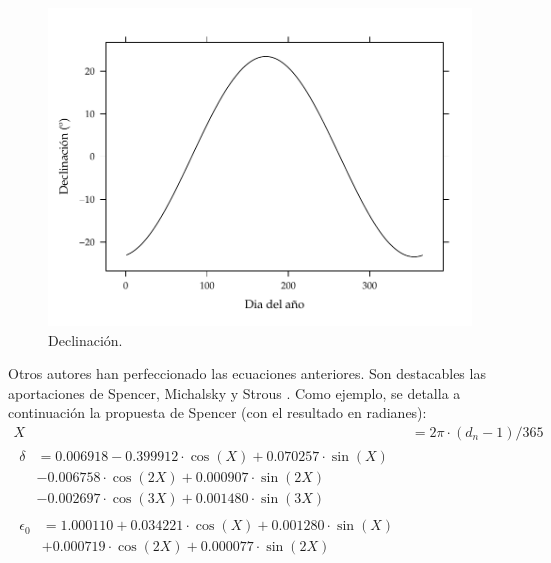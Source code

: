 \begin{figure}
\begin{centering}
\includegraphics[scale=0.65]{../figs/Declinacion}
\end{centering}

\caption{Declinación.\label{fig:Declinacion_cooper}}

\end{figure}

Otros autores han perfeccionado las ecuaciones anteriores. Son
destacables las aportaciones de Spencer, Michalsky y Strous \cite{Spencer1971, Michalsky1988,
  Strous2011}. Como ejemplo, se detalla a continuación la propuesta de
Spencer (con el resultado en radianes):
\begin{align}
  \label{eq:spencer}
  X &= 2 \pi \cdot (d_n-1)/365\\
  \begin{split}
    \delta &= 0.006918 - 0.399912 \cdot \cos(X) + 0.070257 \cdot \sin(X)\\
    &-  0.006758 \cdot \cos(2 X) + 0.000907 \cdot \sin(2 X)\\
    &- 0.002697 \cdot \cos(3 X) + 0.001480 \cdot \sin(3  X)
  \end{split}\\
  \begin{split}
    \epsilon_{0} &= 1.000110 + 0.034221 \cdot \cos(X) + 0.001280 \cdot
    \sin(X)\\
    &+ 0.000719 \cdot \cos(2 X) + 0.000077 \cdot \sin(2 X)
  \end{split}
\end{align}


